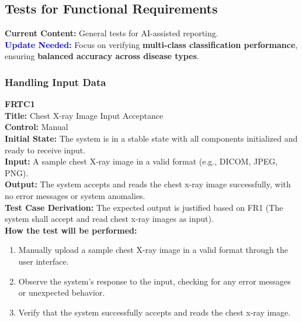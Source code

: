 \documentclass[12pt, titlepage]{article}
\begin{document}
\subsection{Tests for Functional Requirements}

\textbf{Current Content:} General tests for AI-assisted reporting. \\
\textbf{\textcolor{blue}{Update Needed:}} Focus on verifying \textbf{multi-class classification performance}, ensuring \textbf{balanced accuracy across disease types}.

\subsubsection{Handling Input Data}
\textbf{FRTC1}\\
\textbf{Title:} Chest X-ray Image Input Acceptance\\
\textbf{Control:} Manual\\
\textbf{Initial State:} The system is in a stable state with all components initialized and ready to receive input.\\
\textbf{Input:} A sample chest X-ray image in a valid format (e.g., DICOM, JPEG, PNG).\\
\textbf{Output:} The system accepts and reads the chest x-ray image successfully, with no error messages or system anomalies.\\
\textbf{Test Case Derivation:} The expected output is justified based on FR1 (The system shall accept and read chest x-ray images as input).\\
\textbf{How the test will be performed:}
\begin{enumerate}
  \item Manually upload a sample chest X-ray image in a valid format through the user interface.
  \item Observe the system's response to the input, checking for any error messages or unexpected behavior.
  \item Verify that the system successfully accepts and reads the chest x-ray image.
\end{enumerate}
\vspace{1em}
\end{document}
